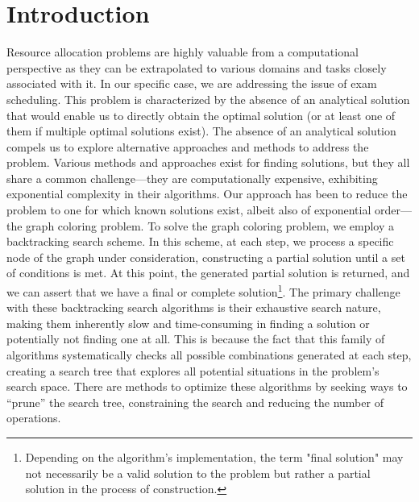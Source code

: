 \documentclass[british,a4paper,11pt,titlepage]{article}
\begin{document}
\section{Introduction}
\label{sec:intro}
Resource allocation problems are highly valuable from a computational perspective as they can be extrapolated to various domains and tasks closely associated with it. In our specific case, we are addressing the issue of exam scheduling. This problem is characterized by the absence of an analytical solution that would enable us to directly obtain the optimal solution (or at least one of them if multiple optimal solutions exist).
\newline
The absence of an analytical solution compels us to explore alternative approaches and methods to address the problem. Various methods and approaches exist for finding solutions, but they all share a common challenge—they are computationally expensive, exhibiting exponential complexity in their algorithms.
\newline
\newline
Our approach has been to reduce the problem to one for which known solutions exist, albeit also of exponential order—the graph coloring problem. To solve the graph coloring problem, we employ a backtracking search scheme. In this scheme, at each step, we process a specific node of the graph under consideration, constructing a partial solution until a set of conditions is met. At this point, the generated partial solution is returned, and we can assert that we have a final or complete solution\footnote{\label{foot:intro}Depending on the algorithm's implementation, the term "final solution" may not necessarily be a valid solution to the problem but rather a partial solution in the process of construction.}.
\newline
\newline
The primary challenge with these backtracking search algorithms is their exhaustive search nature, making them inherently slow and time-consuming in finding a solution or potentially not finding one at all. This is because the fact that this family of algorithms systematically checks all possible combinations generated at each step, creating a search tree that explores all potential situations in the problem's search space.
\newline
There are methods to optimize these algorithms by seeking ways to ``prune'' the search tree, constraining the search and reducing the number of operations.
\cleardoublepage

\end{document}
